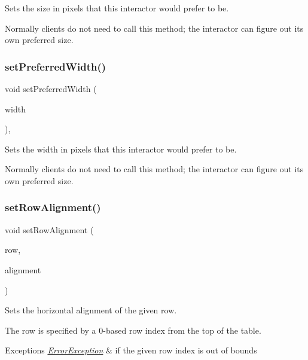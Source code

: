 Sets the size in pixels that this interactor would prefer to be. 

Normally clients do not need to call this method; the interactor can figure out its own preferred size. \mbox{\label{classGInteractor_a3db429ab2fa52efd187eec0ed8cdd9f2}} 
\subsubsection{\texorpdfstring{set\+Preferred\+Width()}{setPreferredWidth()}}
{\footnotesize\ttfamily void set\+Preferred\+Width (\begin{DoxyParamCaption}\item[{double}]{width }\end{DoxyParamCaption})\hspace{0.3cm}{\ttfamily [virtual]}, {\ttfamily [inherited]}}



Sets the width in pixels that this interactor would prefer to be. 

Normally clients do not need to call this method; the interactor can figure out its own preferred size. \mbox{\label{classGTable_ac6a47ba68c502b7d8dc776beeeffccc3}} 
\subsubsection{\texorpdfstring{set\+Row\+Alignment()}{setRowAlignment()}}
{\footnotesize\ttfamily void set\+Row\+Alignment (\begin{DoxyParamCaption}\item[{int}]{row,  }\item[{Horizontal\+Alignment}]{alignment }\end{DoxyParamCaption})\hspace{0.3cm}{\ttfamily [virtual]}}



Sets the horizontal alignment of the given row. 

The row is specified by a 0-\/based row index from the top of the table. 
\begin{DoxyExceptions}{Exceptions}
{\em \mbox{\hyperlink{classErrorException}{Error\+Exception}}} & if the given row index is out of bounds \\
\hline
\end{DoxyExceptions}
\mbox{\label{classGTable_a85ee577aabd189ed64a5c9f66ba61fd2}} 
